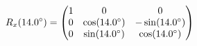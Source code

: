 \documentclass[preview]{standalone}
\begin{document}
\begin{align*}
\special{dvisvgm:raw <g id='unique000'>}R_x(14.0^\circ) = \begin{pmatrix} 1 & 0 & 0 \\ 0 & \cos(14.0^\circ) & -\sin(14.0^\circ) \\ 0 & \sin(14.0^\circ) & \cos(14.0^\circ) \end{pmatrix}\special{dvisvgm:raw </g>}
\end{align*}
\end{document}
